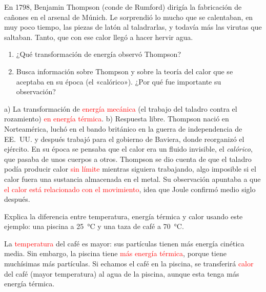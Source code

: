 \begin{exercise}
    En 1798, Benjamin Thompson (conde de Rumford) dirigía la fabricación de cañones en el arsenal de Múnich. Le sorprendió lo mucho que se calentaban, en muy poco tiempo, las piezas de latón al taladrarlas, y todavía más las virutas que saltaban. Tanto, que con ese calor llegó a hacer hervir agua.
    \begin{enumerate}[label=\alph*)]
        \item ¿Qué transformación de energía observó Thompson?
        \item Busca información sobre Thompson y sobre la teoría del calor que se aceptaba en su época (el «calórico»). ¿Por qué fue importante su observación?
    \end{enumerate}
    \begin{solu}
        a) La transformación de \textcolor{red}{energía mecánica} (el trabajo del taladro contra el rozamiento) \textcolor{red}{en energía térmica}.
        b) Respuesta libre. Thompson nació en Norteamérica, luchó en el bando británico en la guerra de independencia de EE.~UU. y después trabajó para el gobierno de Baviera, donde reorganizó el ejército. En su época se pensaba que el calor era un fluido invisible, el \emph{calórico}, que pasaba de unos cuerpos a otros. Thompson se dio cuenta de que el taladro podía producir calor \textcolor{red}{sin límite} mientras siguiera trabajando, algo imposible si el calor fuera una sustancia almacenada en el metal. Su observación apuntaba a que \textcolor{red}{el calor está relacionado con el movimiento}, idea que Joule confirmó medio siglo después.
    \end{solu}
\end{exercise}

\begin{exercise}
    Explica la diferencia entre temperatura, energía térmica y calor usando este ejemplo: una piscina a \qty{25}{\degreeCelsius} y una taza de café a \qty{70}{\degreeCelsius}.
    \begin{solu}
        La \textcolor{red}{temperatura} del café es mayor: sus partículas tienen más energía cinética media. Sin embargo, la piscina tiene \textcolor{red}{más energía térmica}, porque tiene muchísimas más partículas. Si echamos el café en la piscina, se transferirá \textcolor{red}{calor} del café (mayor temperatura) al agua de la piscina, aunque esta tenga más energía térmica.
    \end{solu}
\end{exercise}

